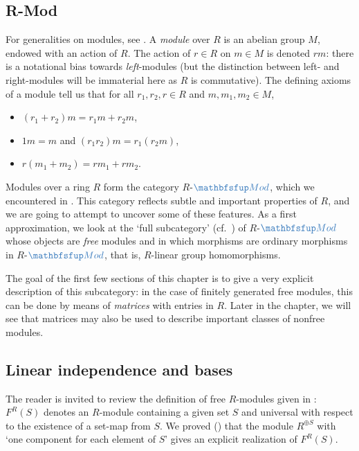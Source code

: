 \subsection{R-Mod}
\label{subsec:linalg:r-mod}
For generalities on modules, see
. A \emph{module} over $R$ is
an abelian group $M$, endowed with an action of $R$. The action of
$r \in R$ on $m \in M$ is denoted $rm$: there is a notational bias
towards \emph{left}-modules (but the distinction between left- and
right-modules will be immaterial here as $R$ is commutative). The
defining axioms of a module tell us that for all $r_1, r_2, r \in R$
and $m, m_1, m_2 \in M$,
\begin{itemize}
\item $(r_1 + r_2)m = r_1 m + r_2 m$,
\item $1m = m$ and $(r_1 r_2)m = r_1(r_2 m)$,
\item $r(m_1 + m_2) = rm_1 + rm_2$.
\end{itemize}
Modules over a ring $R$ form the category $R$-$\categ{Mod}$, which we
encountered in . This category reflects subtle and
important properties of $R$, and we are going to attempt to uncover
some of these features. As a first approximation, we look at the `full
subcategory' (cf.\ ) of $R$-$\categ{Mod}$
whose objects are \emph{free} modules and in which morphisms are
ordinary morphisms in $R$-$\categ{Mod}$, that is, $R$-linear group
homomorphisms.

The goal of the first few sections of this chapter is to give a very
explicit description of this subcategory: in the case of finitely
generated free modules, this can be done by means of \emph{matrices}
with entries in $R$. Later in the chapter, we will see that matrices
may also be used to describe important classes of nonfree modules.

\subsection{Linear independence and bases}%
\label{subsec:linalg:linear-independence-and-bases}
The reader is invited to review the definition of free $R$-modules
given in :
$F^R(S)$ denotes an $R$-module containing a given set $S$ and
universal with respect to the existence of a set-map from $S$. We
proved () that the module $R^{\oplus S}$
with `one component for each element of $S$' gives an explicit
realization of $F^R(S)$.

